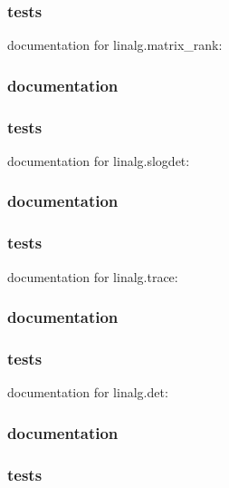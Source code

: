 \documentclass[a4paper,11pt]{article}
\begin{document}
\subsubsection{tests}
documentation for linalg.matrix\_rank:

\subsubsection{documentation}
\subsubsection{tests}
documentation for linalg.slogdet:
    
\subsubsection{documentation}
\subsubsection{tests}
documentation for linalg.trace:

\subsubsection{documentation}
\subsubsection{tests}
documentation for linalg.det:

\subsubsection{documentation}
\subsubsection{tests}
\end{document}
